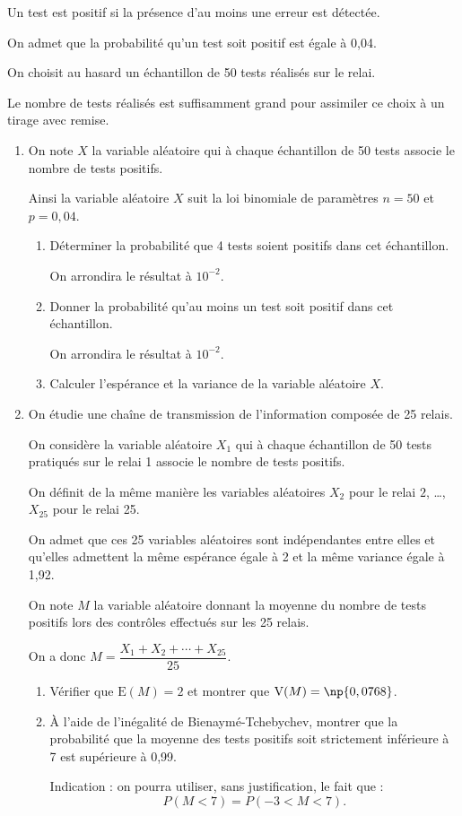 		Un test est positif si la présence d'au moins une erreur est détectée.

		On admet que la probabilité qu'un test soit positif est égale à 0,04.

		On choisit au hasard un échantillon de 50 tests réalisés sur le relai.

		Le nombre de tests réalisés est suffisamment grand pour assimiler ce choix à un tirage avec remise.

		\begin{enumerate}
			\item On note $X$ la variable aléatoire qui à chaque échantillon de 50 tests associe le nombre de tests positifs.

			Ainsi la variable aléatoire $X$ suit la loi binomiale de paramètres $n=50$ et $p=0,04$.

			\begin{enumerate}
				\item Déterminer la probabilité que 4 tests soient positifs dans cet échantillon.

				On arrondira le résultat à $10^{-2}$.

				\item Donner la probabilité qu'au moins un test soit positif dans cet échantillon.

				On arrondira le résultat à $10^{-2}$.
				\item Calculer l'espérance et la variance de la variable aléatoire $X$.
			\end{enumerate}

			\item On étudie une chaîne de transmission de l'information composée de 25 relais.

			On considère la variable aléatoire $X_{1}$ qui à chaque échantillon de 50 tests pratiqués sur le relai 1 associe le nombre de tests positifs.

			On définit de la même manière les variables aléatoires $X_{2}$ pour le relai $2$, \ldots, $X_{25}$ pour le relai 25.

			On admet que ces 25 variables aléatoires sont indépendantes entre elles et qu'elles admettent la même espérance égale à 2 et la même variance égale à 1,92.

			On note $M$ la variable aléatoire donnant la moyenne du nombre de tests positifs lors des contrôles effectués sur les 25 relais.

			On a donc \quad $M=\dfrac{X_{1}+X_{2}+\cdots+X_{25}}{25}$.
			\begin{enumerate}
				\item Vérifier que $\mathrm{E}(M)=2$ et montrer que $\mathrm{V}(M)=\np{0,0768}$.

				\item À l'aide de l'inégalité de Bienaymé-Tchebychev, montrer que la probabilité que la moyenne des tests positifs soit strictement inférieure à 7 est supérieure à 0,99.

				Indication : on pourra utiliser, sans justification, le fait que :
				\[P(M<7)=P(-3<M<7).\]
			\end{enumerate}
		\end{enumerate}

